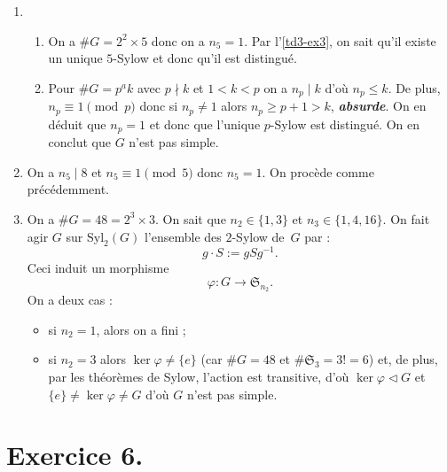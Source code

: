 \documentclass[./main]{subfiles}
\begin{document}
  \begin{enumerate}
    \item 
      \begin{enumerate}
        \item On a $\# G = 2^2 \times 5$ donc on a $n_5 = 1$. Par l'\ref{td3-ex3}, on sait qu'il existe un unique $5$-Sylow et donc qu'il est distingué.
        \item Pour $\#G = p^a k$ avec  $p \nmid k$ et  $1 < k < p$ on a  $n_p  \mid k$ d'où $n_p \le k$.
          De plus, $n_p \equiv 1 \pmod p$ donc si  $n_p \neq 1$ alors $n_p \ge p+1 > k$, \textit{\textbf{absurde}}.
          On en déduit que $n_p = 1$ et donc que l'unique $p$-Sylow est distingué.
          On en conclut que $G$ n'est pas simple.
      \end{enumerate}
    \item On a $n_5  \mid 8$ et $n_5 \equiv 1 \pmod 5$ donc $n_5 =1$. On procède comme précédemment.
    \item On a $\# G = 48 = 2^3 \times 3$.
      On sait que $n_2 \in \{1,3\} $ et $n_3 \in \{1,4,16\}$.
      On fait agir $G$ sur $\mathrm{Syl}_2(G)$ l'ensemble des $2$-Sylow de~$G$ par :
      \[
        g \cdot S := g S g^{-1}
      .\]
      Ceci induit un morphisme \[
        \varphi : G \longrightarrow \mathfrak{S}_{n_2}
      .\]
      On a deux cas :
      \begin{itemize}
        \item si $n_2 = 1$, alors on a fini ;
        \item  si $n_2 = 3$ alors  $\ker \varphi \neq \{e\} $ (car $\# G = 48$ et  $\#\mathfrak{S}_3 = 3! = 6$) et, de plus, par les théorèmes de Sylow, l'action est transitive, d'où $\ker \varphi \triangleleft G$ et  $\{e\}  \neq \ker\varphi \neq G$ d'où $G$ n'est pas simple.
      \end{itemize}
  \end{enumerate}

  \section{Exercice 6.}
  
\end{document}
